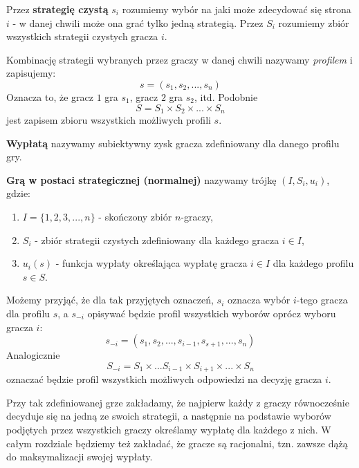 \documentclass[polish]{standalone}
\begin{document}
\begin{definition}
Przez \textbf{strategię czystą} $s_i$ rozumiemy wybór na jaki może zdecydować się strona $i$ - w danej chwili może ona
grać tylko jedną strategią. Przez $S_i$ rozumiemy zbiór wszystkich strategii czystych gracza $i$.
\cite[str.~4]{FT-GT}
\end{definition}

Kombinację strategii wybranych przez graczy w danej chwili nazywamy \textit{profilem} i zapisujemy:
$$s = (s_1, s_2, ..., s_n)$$
Oznacza to, że gracz $1$ gra $s_1$, gracz $2$ gra $s_2$, itd. Podobnie
$$S = S_1 \times S_2 \times ... \times S_n$$
jest zapisem zbioru wszystkich możliwych profili $s$.

\begin{definition}
\textbf{Wypłatą} nazywamy subiektywny zysk gracza zdefiniowany dla danego profilu gry.
\cite[str.~4]{FT-GT}
\end{definition}

\begin{definition}
\textbf{Grą w postaci strategicznej (normalnej)} nazywamy trójkę
$(I, S_i, u_i)$, gdzie:
\begin{enumerate}
\item $I = \{ 1, 2, 3, ..., n \}$ - skończony zbiór $n$-graczy,
\item $S_i$ - zbiór strategii czystych  zdefiniowany dla każdego gracza $i \in I$,
\item $u_i(s)$ - funkcja wypłaty określająca wypłatę gracza $i \in I$ dla każdego profilu
$s \in S$.
\end{enumerate}
\cite[str.~4]{FT-GT}
\end{definition}

Możemy przyjąć, że dla tak przyjętych oznaczeń, $s_i$ oznacza wybór $i$-tego gracza dla profilu $s$, a $s_{-i}$ opisywać
będzie profil wszystkich wyborów oprócz wyboru gracza $i$:
$$s_{-i} = (s_1, s_2, ..., s_{i-1}, s_{s+1}, ..., s_n)$$
Analogicznie
$$S_{-i} = S_1 \times ... S_{i-1} \times S_{i+1} \times ... \times S_n$$
oznaczać będzie profil wszystkich możliwych odpowiedzi na decyzję gracza $i$.

Przy tak zdefiniowanej grze zakładamy, że najpierw każdy z graczy równocześnie decyduje się na jedną ze swoich
strategii, a następnie na podstawie wyborów podjętych przez wszystkich graczy określamy wypłatę dla każdego z nich.
W całym rozdziale będziemy też zakładać, że gracze są racjonalni, tzn. zawsze dążą do maksymalizacji swojej wypłaty.
\end{document}
